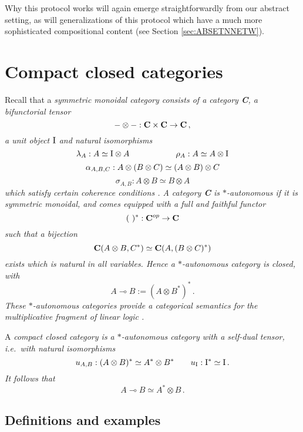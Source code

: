 \documentclass[10pt]{article}
\begin{document}
\vspace{0.6mm}\noindent
Why this protocol works will again  emerge straightforwardly from our
abstract setting, as will 
generalizations of this protocol which have a much more sophisticated
compositional content (see Section
\ref{sec:ABSETNNETW}).

\section{Compact closed categories} 

Recall that a \em symmetric monoidal category \em consists of a category {\bf C},
a bifunctorial \em tensor \em 
\[
-\otimes-:{\bf C}\times{\bf C}\to{\bf C}\,,
\]
a \em unit \em object
${\rm I}$ and natural isomorphisms 
\[
\lambda_A : A \simeq {\rm I}\otimes A\quad\quad\quad\quad\quad\ \ \rho_A: A \simeq
A\otimes{\rm I}
\]
\[
\alpha_{A,B,C}:A\otimes(B\otimes C)\simeq (A\otimes B)\otimes C\vspace{0.5mm} 
\] 
\[
\sigma_{A,B}:A\otimes B\simeq B\otimes A
\]
which satisfy certain coherence conditions \cite{MacLane}.
A category {\bf C} is \em $*$-autonomous \em \cite{Barr} if
it is symmetric monoidal, and comes equipped with a full and
faithful functor 
\[
(\ )^*:{\bf C}^{op}\to{\bf C}
\]
such that a bijection
\[ 
{\bf C}(A\otimes B,C^*)\simeq {\bf C}(A,(B\otimes C)^*)
\]
exists which is natural in all variables. 
Hence a $*$-autonomous category is closed, with
\[
{A\multimap B:=(A\otimes B^*)^*}\,.
\]
These $*$-autonomous categories
provide a categorical semantics for the multiplicative
fragment of linear logic \cite{Seely}.

A \em compact closed category \em \cite{Kelly} is a
$*$-autonomous category with a self-dual tensor,
i.e.~with natural isomorphisms
\[
u_{A,B}:(A\otimes B)^*\simeq A^*\otimes B^* \qquad u_{{\rm I}} : {\rm I}^* \simeq
{\rm I}\,.
\] 
It follows that 
\[
A\multimap B\simeq A^*\otimes B\,.
\] 

\subsection{Definitions and examples}
\end{document}
